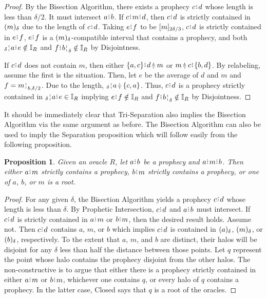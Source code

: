 \documentclass[12pt]{article}
\newtheorem{proposition}{Proposition}[section]
\begin{document}
\begin{proof}
    By the Bisection Algorithm, there exists a prophecy $c\rint d$ whose length is less than $\delta/2$. It must intersect $a \rint b$. If $c\rint m\rint d$, then $c\rint d$ is strictly contained in $\halo{m}$ due to the length of $c\rint d$. Taking $e\rint f$ to be  $\clhalo[2 \delta/3]{m}$, $c\rint d$ is strictly contained in $e\rint f$, $e\rint f$ is a $\halo{m}$-compatible interval that contains a prophecy, and both  $\fuzbleft{a}\rint e \notin \mathbb{I}_R$ and $f\rint \fuzbright{b} \notin \mathbb{I}_R$ by Disjointness. 
    
     If $c\rint d$ does not contain $m$, then either $\{a, c\}\rint d\betneq m$ or $m \betneq c \rint  \{b, d\}$. By relabeling, assume the first is the situation. Then, let $e$ be the average of $d$ and $m$ and $f = \fuzbright[b, \delta/2]{m}$. Due to the length, $\fuzbleft{a} \betneq \{c, a\}$. Thus, $c\rint d$ is a prophecy strictly contained in  $\fuzbleft{a}\rint e \in \mathbb{I}_R$ implying $e\rint f \notin \mathbb{I}_R$ and  $f\rint \fuzbright{b} \notin \mathbb{I}_R$ by Disjointness.
\end{proof}


It should be immediately clear that Tri-Separation also implies the Bisection Algorithm via the same argument as before. The Bisection Algorithm can also be used to imply the Separation proposition which will follow easily from the following proposition. 

\begin{proposition}
    Given an oracle $R$, let $a \rint b$ be a prophecy and $a \rint  m \rint  b$. Then either $a\rint m$ strictly contains a prophecy, $b\rint m$ strictly contains a prophecy, or one of $a$, $b$, or $m$ is a root. 
\end{proposition}

\begin{proof}
    For any given $\delta$, the Bisection Algorithm yields a prophecy $c\rint d$ whose length is less than $\delta$. By Prophetic Intersection, $c\rint d$ and $a\rint b$ must intersect. If $c\rint d$ is strictly contained in $a\rint m$ or $b\rint m$, then the desired result holds. Assume not. Then $c\rint d$ contains $a$, $m$, or $b$ which implies $c\rint d$ is contained in $\halo{a}$, $\halo{m}$, or $\halo{b}$, respectively. To the extent that $a$, $m$, and $b$ are distinct, their halos will be disjoint for any $\delta$ less than half the distance between those points. Let $q$ represent the point whose halo contains the prophecy disjoint from the other halos. The non-constructive is to argue that either there is a prophecy strictly contained in either $a\rint m$ or $b\rint m$, whichever one contains $q$, or every halo of $q$ contains a prophecy. In the latter case, Closed says that $q$ is a root of the oracles.  
\end{proof}
\end{document}
